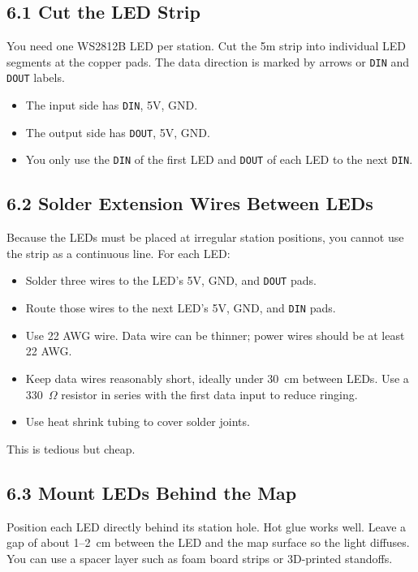 \documentclass[11pt]{article}
\begin{document}
\subsection{6.1 Cut the LED Strip}

You need one WS2812B LED per station. Cut the 5m strip into individual LED segments at the copper pads. The data direction is marked by arrows or \texttt{DIN} and \texttt{DOUT} labels.

\begin{itemize}
    \item The input side has \texttt{DIN}, 5V, GND.
    \item The output side has \texttt{DOUT}, 5V, GND.
    \item You only use the \texttt{DIN} of the first LED and \texttt{DOUT} of each LED to the next \texttt{DIN}.
\end{itemize}

\subsection{6.2 Solder Extension Wires Between LEDs}

Because the LEDs must be placed at irregular station positions, you cannot use the strip as a continuous line. For each LED:

\begin{itemize}
    \item Solder three wires to the LED's 5V, GND, and \texttt{DOUT} pads.
    \item Route those wires to the next LED's 5V, GND, and \texttt{DIN} pads.
    \item Use 22 AWG wire. Data wire can be thinner; power wires should be at least 22 AWG.
    \item Keep data wires reasonably short, ideally under 30~cm between LEDs. Use a 330~$\Omega$ resistor in series with the first data input to reduce ringing.
    \item Use heat shrink tubing to cover solder joints.
\end{itemize}

This is tedious but cheap.

\subsection{6.3 Mount LEDs Behind the Map}

Position each LED directly behind its station hole. Hot glue works well. Leave a gap of about 1--2~cm between the LED and the map surface so the light diffuses. You can use a spacer layer such as foam board strips or 3D-printed standoffs.
\end{document}
